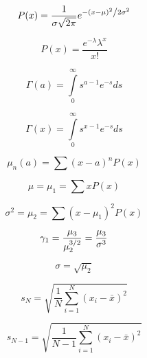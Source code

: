 \documentclass{article}
\begin{document}
\begin{equation}
P(x) = \frac{1}{{\sigma \sqrt {2\pi } }}e^{{{ - \left( {x - \mu } \right)^2 } \mathord{\left/
			{\vphantom {{ - \left( {x - \mu } \right)^2 } {2\sigma ^2 }}} \right.
			\kern-\nulldelimiterspace} {2\sigma ^2 }}}
\end{equation}

\begin{equation}
P\left( x \right) = \frac{{e^{ - \lambda } \lambda ^x }}{{x!}}
\end{equation}

\begin{equation}
\Gamma \left( a \right) = \int\limits_0^\infty  {s^{a - 1} } e^{ - s} ds
\end{equation}

\begin{equation}
\Gamma \left( x \right) = \int\limits_0^\infty  {s^{x - 1} e^{ - s} ds}
\end{equation}

\begin{equation}
\mu _n \left( a \right) = \sum {\left( {x - a} \right)^n P\left( x \right)}
\end{equation}

\begin{equation}
\mu  = \mu _1  = \sum {xP\left( x \right)}
\end{equation}

\begin{equation}
\sigma ^2  = \mu _2  = \sum {\left( {x - \mu _1 } \right)^2 P\left( x \right)}
\end{equation}

\begin{equation}
\gamma _1  = \frac{{\mu _3 }}{{\mu _2 ^{{3 \mathord{\left/
					{\vphantom {3 2}} \right.
					\kern-\nulldelimiterspace} 2}} }} = \frac{{\mu _3 }}{{\sigma ^3 }}
\end{equation}

\begin{equation}
\sigma  = \sqrt {\mu _2 }
\end{equation}

\begin{equation}
s_N  = \sqrt {\frac{1}{N}\sum\limits_{i = 1}^N {\left( {x_i  - \bar x} \right)^2 } }
\end{equation}

\begin{equation}
s_{N - 1}  = \sqrt {\frac{1}{{N - 1}}\sum\limits_{i = 1}^N {\left( {x_i  - \bar x} \right)^2 } }
\end{equation}
\end{document}

